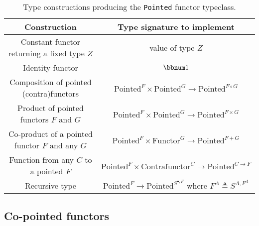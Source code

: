 \begin{table}
\begin{centering}
\begin{tabular}{|c|c|}
\hline 
\textbf{\footnotesize{}Construction} & \textbf{\footnotesize{}Type signature to implement}\tabularnewline
\hline 
\hline 
{\footnotesize{}Constant functor returning a fixed type $Z$} & {\footnotesize{}value of type $Z$}\tabularnewline
\hline 
{\footnotesize{}Identity functor} & {\footnotesize{}$\bbnum 1$}\tabularnewline
\hline 
{\footnotesize{}Composition of pointed (contra)functors} & {\footnotesize{}$\text{Pointed}^{F}\times\text{Pointed}^{G}\rightarrow\text{Pointed}^{F\circ G}$}\tabularnewline
\hline 
{\footnotesize{}Product of pointed functors $F$ and $G$} & {\footnotesize{}$\text{Pointed}^{F}\times\text{Pointed}^{G}\rightarrow\text{Pointed}^{F\times G}$}\tabularnewline
\hline 
{\footnotesize{}Co-product of a pointed functor $F$ and any $G$} & {\footnotesize{}$\text{Pointed}^{F}\times\text{Functor}^{G}\rightarrow\text{Pointed}^{F+G}$}\tabularnewline
\hline 
{\footnotesize{}Function from any $C$ to a pointed $F$} & {\footnotesize{}$\text{Pointed}^{F}\times\text{Contrafunctor}^{C}\rightarrow\text{Pointed}^{C\rightarrow F}$}\tabularnewline
\hline 
{\footnotesize{}Recursive type} & {\footnotesize{}$\text{Pointed}^{F}\rightarrow\text{Pointed}^{S^{\bullet,F}}$
where $F^{A}\triangleq S^{A,F^{A}}$}\tabularnewline
\hline 
\end{tabular}
\par\end{centering}
\caption{Type constructions producing the \lstinline!Pointed! functor typeclass.\label{tab:Type-constructions-for-pointed-functor}}
\end{table}


\subsection{Co-pointed functors\label{subsec:Co-pointed-functors}}


